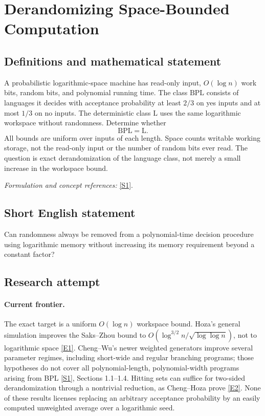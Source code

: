 \documentclass[11pt,a4paper]{article}
\newcommand{\sref}[2]{\hyperlink{source:#1:#2}{[S#2]}}
\newcommand{\eref}[2]{\hyperlink{extra:#1:#2}{[E#2]}}
\newif\ifshowcatalogue
\newcommand{\cataloguescope}[1]{\ifshowcatalogue
 \paragraph{Exact scope in the supplied catalogue.}
 \begin{quote}\small #1\end{quote}\fi}
\numberwithin{equation}{section}
\begin{document}
\setcounter{section}{0}
\clearpage
\section*{\texorpdfstring{Derandomizing Space-Bounded Computation}{Derandomizing Space-Bounded Computation}}\label{30004922}
\subsection{Definitions and mathematical statement}
A probabilistic logarithmic-space machine has read-only input, $O(\log n)$ work bits, random bits, and polynomial running time. The class $\mathrm{BPL}$ consists of languages it decides with acceptance probability at least $2/3$ on yes inputs and at most $1/3$ on no inputs. The deterministic class $\mathrm L$ uses the same logarithmic workspace without randomness. Determine whether
\[
 \mathrm{BPL}=\mathrm L.
\]
All bounds are uniform over inputs of each length. Space counts writable working storage, not the read-only input or the number of random bits ever read. The question is exact derandomization of the language class, not merely a small increase in the workspace bound.
\par\smallskip\textit{Formulation and concept references:} \sref{30004922}{1}.
\cataloguescope{Prove or disprove that every language decidable by a probabilistic Turing machine using O(log n) workspace, polynomial time, and bounded two-sided error is decidable by a deterministic Turing machine using O(log n) workspace.}
\subsection{Short English statement}
Can randomness always be removed from a polynomial-time decision procedure using logarithmic memory without increasing its memory requirement beyond a constant factor?
\subsection{Research attempt}

\paragraph{Current frontier.}
The exact target is a uniform $O(\log n)$ workspace bound. Hoza's general
simulation improves the Saks--Zhou bound to
$O(\log^{3/2}n/\sqrt{\log\log n})$, not to logarithmic space
\eref{30004922}{1}. Cheng--Wu's newer weighted generators improve several
parameter regimes, including short-wide and regular branching programs;
those hypotheses do not cover all polynomial-length, polynomial-width
programs arising from BPL \sref{30004922}{1}, Sections 1.1--1.4. Hitting sets
can suffice for two-sided derandomization through a nontrivial reduction,
as Cheng--Hoza prove \eref{30004922}{2}. None of these results licenses
replacing an arbitrary acceptance probability by an easily computed
unweighted average over a logarithmic seed.
\end{document}
